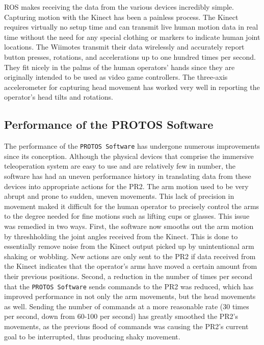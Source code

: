 \documentclass{sig-alternate}
\begin{document}
\indent  ROS makes receiving the data from the various devices incredibly simple. Capturing motion with the Kinect has been a painless process. 
The Kinect requires virtually no setup time and can transmit live human motion data in real time without the 
need for any special clothing or markers to indicate human joint locations.
The Wiimotes transmit their data wirelessly and accurately report button presses, rotations, and accelerations up to one hundred times per second. They fit 
nicely in the palms of the human operators' hands since they are originally intended to be used as video game controllers. The three-axis accelerometer for capturing head 
movement has worked very well in reporting the operator's head tilts and rotations.

\subsection {Performance of the PROTOS Software}
\indent The performance of the {\tt PROTOS Software} has undergone numerous improvements since its conception. 
Although the physical devices that comprise the immersive teleoperation system 
are easy to use and are relatively few in number, the software has had an uneven performance history in translating data from these devices 
into appropriate actions for the PR2. The arm motion used to be very abrupt and prone to sudden, uneven movements. This lack of 
precision in movement maked it difficult for the human operator to precisely control the arms to the degree needed for fine motions such as lifting cups or glasses. This
issue was remedied in two ways. First, the software now smooths out the arm motion by threshholding the joint angles received from the Kinect.
This is done to essentially remove noise from the Kinect output picked up by unintentional arm shaking or wobbling. New actions are only sent to the PR2 if data received 
from the Kinect indicates that the operator's arms have moved a certain amount from their previous positions. Second, a reduction in the number of times per second that the
{\tt PROTOS Software} sends commands to the PR2 was reduced, which has improved performance in not only the arm movements, but the head movements as well. Sending the 
number of commands at a more reasonable rate (30 times per second, down from 60-100 per second) has greatly smoothed the PR2's movements, as the previous flood of commands
was causing the PR2's current goal to be interrupted, thus producing shaky movement.
\end{document}
